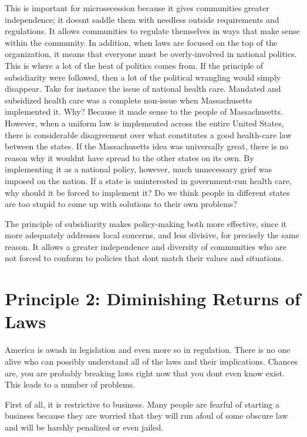 This is important for microsecession because it gives communities
greater independence; it doesn{\textquotesingle}t saddle them with
needless outside requirements and regulations. It allows communities to
regulate themselves in ways that make sense within the community. In
addition, when laws are focused on the top of the organization, it
means that everyone must be overly-involved in national politics. This
is where a lot of the heat of politics comes from. If the principle of
subsidiarity were followed, then a lot of the political wrangling would
simply disappear. Take for instance the issue of national health care.
Mandated and subsidized health care was a complete non-issue when
Massachusetts implemented it. Why? Because it made sense to the people
of Massachusetts. However, when a uniform law is implemented across the
entire United States, there is considerable disagreement over what
constitutes a good health-care law between the states. If the
Massachusetts idea was universally great, there is no reason why it
wouldn{\textquotesingle}t have spread to the other states on its own.
By implementing it as a national policy, however, much unnecessary
grief was imposed on the nation. If a state is uninterested in
government-run health care, why should it be forced
to implement it?  Do
we think people in different states are too stupid to come up with
solutions to their own problems?


The principle of subsidiarity makes policy-making both more effective,
since it more adequately addresses local concerns, and less divisive,
for precisely the same reason. It allows a greater independence and
diversity of communities who are not forced to conform to policies that
don{\textquotesingle}t match their values and situations.

\section{Principle 2: Diminishing Returns of Laws}

America is awash in legislation and even more so in regulation. There is
no one alive who can possibly understand all of the laws and their
implications. Chances are, you are probably breaking laws right now
that you don{\textquotesingle}t even know exist. This leads to a number
of problems. 


First of all, it is restrictive to business. Many people are fearful of
starting a business because they are worried that they will run afoul
of some obscure law and will be harshly penalized or even jailed. 



